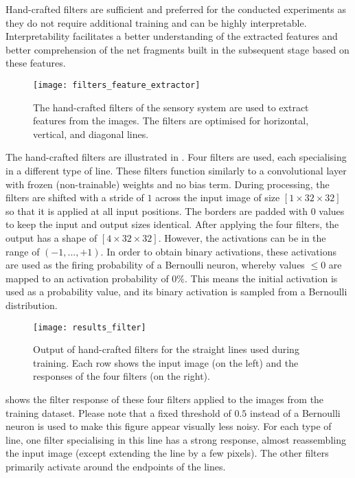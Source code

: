 Hand-crafted filters are sufficient and preferred for the conducted experiments as they do not require additional training and can be highly interpretable. Interpretability facilitates a better understanding of the extracted features and better comprehension of the net fragments built in the subsequent stage based on these features. 

\begin{figure}[h]
    \centering
    \texttt{[image: filters\_feature\_extractor]}
    \caption[Hand-crafted filters of the sensory system]{The hand-crafted filters of the sensory system are used to extract features from the images. The filters are optimised for horizontal, vertical, and diagonal lines.}
\end{figure}

The hand-crafted filters are illustrated in .
Four filters are used, each specialising in a different type of line.
These filters function similarly to a convolutional layer with frozen (non-trainable) weights and no bias term. 
During processing, the filters are shifted with a stride of $1$ across the input image of size $[1 \times 32 \times 32]$ so that it is applied at all input positions. 
The borders are padded with $0$ values to keep the input and output sizes identical.
After applying the four filters, the output has a shape of $[4 \times 32 \times 32]$. 
However, the activations can be in the range of $(-1, ..., +1)$.
In order to obtain binary activations, these activations are used as the firing probability of a Bernoulli neuron, whereby values $\leq 0$ are mapped to an activation probability of $0\%$.
This means the initial activation is used as a probability value, and its binary activation is sampled from a Bernoulli distribution.


\begin{figure}[h]
    \centering
    \texttt{[image: results\_filter]}
    \caption[Output of hand-crafted filters for straight lines]{Output of hand-crafted filters for the straight lines used during training. Each row shows the input image (on the left) and the responses of the four filters (on the right).}
\end{figure}

 shows the filter response of these four filters applied to the images from the training dataset.
Please note that a fixed threshold of $0.5$ instead of a Bernoulli neuron is used to make this figure appear visually less noisy.
For each type of line, one filter specialising in this line has a strong response, almost reassembling the input image (except extending the line by a few pixels).
The other filters primarily activate around the endpoints of the lines.


